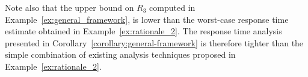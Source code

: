 Note also that the upper bound on $R_3$ computed in
Example~\ref{ex:general_framework}, is lower than the worst-case
response time estimate obtained in Example~\ref{ex:rationale_2}. The response time analysis presented in Corollary~\ref{corollary:general-framework} is therefore tighter than the simple combination of existing analysis techniques proposed in Example~\ref{ex:rationale_2}.






